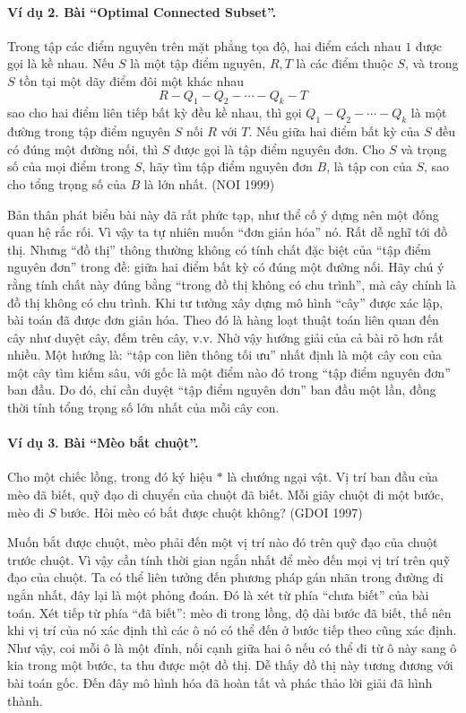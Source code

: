 \documentclass[11pt]{article}
\begin{document}
\paragraph{Ví dụ 2. Bài ``Optimal Connected Subset''.}
Trong tập các điểm nguyên trên mặt phẳng tọa độ, hai điểm cách nhau \(1\) được
gọi là kề nhau. Nếu \(S\) là một tập điểm nguyên, \(R,T\) là các điểm thuộc
\(S\), và trong \(S\) tồn tại một dãy điểm đôi một khác nhau
\[
  R-Q_1-Q_2-\cdots-Q_k-T
\]
sao cho hai điểm liên tiếp bất kỳ đều kề nhau, thì gọi
\(Q_1-Q_2-\cdots-Q_k\) là một đường trong tập điểm nguyên \(S\) nối \(R\) với
\(T\). Nếu giữa hai điểm bất kỳ của \(S\) đều có đúng một đường nối, thì \(S\)
được gọi là tập điểm nguyên đơn. Cho \(S\) và trọng số của mọi điểm trong
\(S\), hãy tìm tập điểm nguyên đơn \(B\), là tập con của \(S\), sao cho tổng
trọng số của \(B\) là lớn nhất. (NOI 1999)

Bản thân phát biểu bài này đã rất phức tạp, như thể cố ý dựng nên một đống
quan hệ rắc rối. Vì vậy ta tự nhiên muốn ``đơn giản hóa'' nó. Rất dễ nghĩ tới
đồ thị. Nhưng ``đồ thị'' thông thường không có tính chất đặc biệt của ``tập
điểm nguyên đơn'' trong đề: giữa hai điểm bất kỳ có đúng một đường nối. Hãy
chú ý rằng tính chất này đúng bằng ``trong đồ thị không có chu trình'', mà cây
chính là đồ thị không có chu trình. Khi tư tưởng xây dựng mô hình ``cây'' được
xác lập, bài toán đã được đơn giản hóa. Theo đó là hàng loạt thuật toán liên
quan đến cây như duyệt cây, đếm trên cây, v.v. Nhờ vậy hướng giải của cả bài
rõ hơn rất nhiều. Một hướng là: ``tập con liên thông tối ưu'' nhất định là một
cây con của một cây tìm kiếm sâu, với gốc là một điểm nào đó trong ``tập điểm
nguyên đơn'' ban đầu. Do đó, chỉ cần duyệt ``tập điểm nguyên đơn'' ban đầu một
lần, đồng thời tính tổng trọng số lớn nhất của mỗi cây con.

\paragraph{Ví dụ 3. Bài ``Mèo bắt chuột''.}
Cho một chiếc lồng, trong đó ký hiệu \(\ast\) là chướng ngại vật. Vị trí ban
đầu của mèo đã biết, quỹ đạo di chuyển của chuột đã biết. Mỗi giây chuột đi
một bước, mèo đi \(S\) bước. Hỏi mèo có bắt được chuột không? (GDOI 1997)

Muốn bắt được chuột, mèo phải đến một vị trí nào đó trên quỹ đạo của chuột
trước chuột. Vì vậy cần tính thời gian ngắn nhất để mèo đến mọi vị trí trên
quỹ đạo của chuột. Ta có thể liên tưởng đến phương pháp gán nhãn trong đường
đi ngắn nhất, đây lại là một phỏng đoán. Đó là xét từ phía ``chưa biết'' của
bài toán. Xét tiếp từ phía ``đã biết'': mèo đi trong lồng, độ dài bước đã biết,
thế nên khi vị trí của nó xác định thì các ô nó có thể đến ở bước tiếp theo
cũng xác định. Như vậy, coi mỗi ô là một đỉnh, nối cạnh giữa hai ô nếu có thể
đi từ ô này sang ô kia trong một bước, ta thu được một đồ thị. Dễ thấy đồ thị
này tương đương với bài toán gốc. Đến đây mô hình hóa đã hoàn tất và phác
thảo lời giải đã hình thành.
\end{document}
